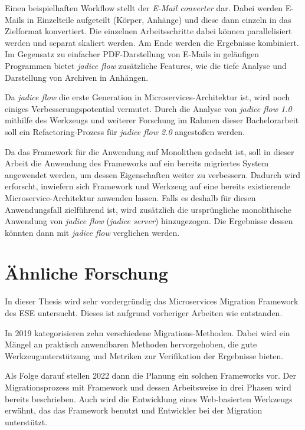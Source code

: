 Einen beispielhaften Workflow stellt der \emph{E-Mail converter} dar.
Dabei werden E-Mails in Einzelteile aufgeteilt (Körper, Anhänge) und diese dann einzeln in das Zielformat konvertiert.
Die einzelnen Arbeitsschritte dabei können parallelisiert werden und separat skaliert werden.
Am Ende werden die Ergebnisse kombiniert.
Im Gegensatz zu einfacher PDF-Darstellung von E-Mails in geläufigen Programmen bietet \emph{jadice flow} zusätzliche Features, wie die tiefe Analyse und Darstellung von Archiven in Anhängen.

Da \emph{jadice flow} die erste Generation in Microservices-Architektur ist, wird noch einiges Verbesserungspotential vermutet.
Durch die Analyse von \emph{jadice flow 1.0} mithilfe des Werkzeugs und weiterer Forschung im Rahmen dieser Bachelorarbeit soll ein Refactoring-Prozess für \emph{jadice flow 2.0} angestoßen werden.

Da das Framework für die Anwendung auf Monolithen gedacht ist, soll in dieser Arbeit die Anwendung des Frameworks auf ein bereits migriertes System angewendet werden, um dessen Eigenschaften weiter zu verbessern.
Dadurch wird erforscht, inwiefern sich Framework und Werkzeug auf eine bereits existierende Microservice-Architektur anwenden lassen.
Falls es deshalb für diesen Anwendungsfall zielführend ist, wird zusätzlich die ursprüngliche monolithische Anwendung von \emph{jadice flow} (\emph{jadice server}) hinzugezogen.
Die Ergebnisse dessen könnten dann mit \emph{jadice flow} verglichen werden.

\section{Ähnliche Forschung}

In dieser Thesis wird sehr vordergründig das Microservices Migration Framework des ESE  untersucht.
Dieses ist aufgrund vorheriger Arbeiten wie  entstanden.

In 2019 kategorisieren  zehn verschiedene Migrations-Methoden.
Dabei wird ein Mängel an praktisch anwendbaren Methoden hervorgehoben, die gute Werkzeugunterstützung und Metriken zur Verifikation der Ergebnisse bieten.

Als Folge darauf stellen  2022 dann die Planung ein solchen Frameworks vor. Der Migrationsprozess mit Framework und dessen Arbeitsweise in drei Phasen wird bereits beschrieben. Auch wird die Entwicklung eines Web-basierten Werkzeugs erwähnt, das das Framework benutzt und Entwickler bei der Migration unterstützt.

